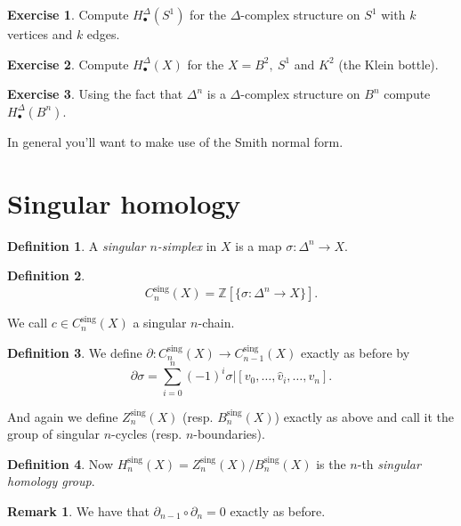 \documentclass[12pt]{article}
\theoremstyle{definition}
\theoremstyle{definition}
\newtheorem*{defn}{Definition}
\newtheorem*{exer}{Exercise}
\newtheorem*{rmk}{Remark}
\newcommand{\ZZ}{\mathbb{Z}}
\renewcommand{\H}{H_\bullet}
\begin{document}
\begin{exer}
Compute $\H^\Delta (S^1)$ for the $\Delta$-complex structure on $S^1$ with $k$ vertices and $k$ edges.
\end{exer}

\begin{exer}
Compute $\H^\Delta (X)$ for the $X = B^2,\ S^1$ and $K^2$ (the Klein bottle).
\end{exer}

\begin{exer}
Using the fact that $\Delta^n$ is a $\Delta$-complex structure on $B^n$ compute $\H^\Delta (B^n)$.

In general you'll want to make use of the Smith normal form.
\end{exer}

\section{Singular homology}
\begin{defn}
A \emph{singular $n$-simplex} in $X$ is a map $\sigma \colon \Delta^n \to X$.
\end{defn}

\begin{defn}
\[
C_n^{\text{sing}}(X) = \ZZ[\{\sigma\colon \Delta^n \to X\}].\]
\end{defn}

We call $c \in C_n^\text{sing}(X)$ a singular $n$-chain.

\begin{defn}
We define $\partial\colon C_n^\text{sing}(X) \to C_{n-1}^\text{sing}(X)$ exactly as before by
\[\partial \sigma = \sum_{i=0}^{n} (-1)^i \sigma|[v_0,\ldots,\hat{v}_i, \ldots, v_n].\]
\end{defn}

And again we define $Z_n^\text{sing}(X)$ (resp. $B_n^\text{sing}(X)$) exactly as above and call it the group of singular $n$-cycles (resp. $n$-boundaries).

\begin{defn}
Now $H_n^\text{sing}(X) = Z_n^\text{sing}(X)/B_n^\text{sing}(X)$ is the $n$-th \emph{singular homology group}.
\end{defn}

\begin{rmk}
We have that $\partial_{n-1}\circ \partial_n = 0$ exactly as before.
\end{rmk}
\end{document}
